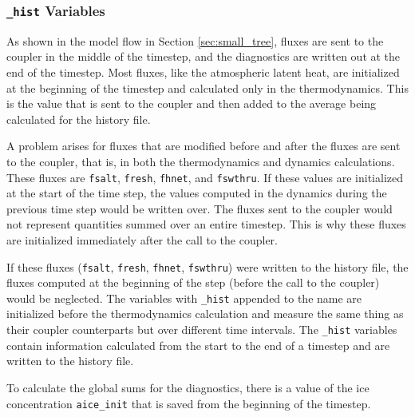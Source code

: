 \subsubsection*{{\tt \_hist} Variables}

As shown in the model flow in Section \ref{sec:small_tree}, fluxes are sent to the
coupler in the middle of the timestep, and the diagnostics are written out at
the end of the timestep.  Most fluxes, like the atmospheric latent heat, are
initialized at the beginning of the timestep and calculated only in the thermodynamics.
This is the value that is sent to the coupler and then added to the average being
calculated for the history file.

A problem arises for fluxes that are modified before and after the fluxes are sent
to the coupler, that is, in both the thermodynamics and dynamics calculations. 
These fluxes are {\tt fsalt}, {\tt fresh}, {\tt fhnet}, and {\tt fswthru}.
If these values are initialized at the start of the time step, the values computed
in the dynamics during the previous time step would be written over. The
fluxes sent to the coupler would not represent quantities summed over an entire
timestep.  This is why these fluxes are initialized immediately after the call
to the coupler.

If these fluxes ({\tt fsalt}, {\tt fresh}, {\tt fhnet}, {\tt fswthru}) were
written to the history file, the fluxes computed at the beginning of the step
(before the call to the coupler) would be neglected.  The variables with
{\tt \_hist} appended to the name are initialized before the thermodynamics
calculation and measure the same thing as their coupler counterparts but over
different time intervals.  The {\tt \_hist} variables contain information
calculated from the start to the end of a timestep and are written to the
history file.

To calculate the global sums for the diagnostics, there is a value of
the ice concentration {\tt aice\_init} that is saved from the beginning
of the timestep.

